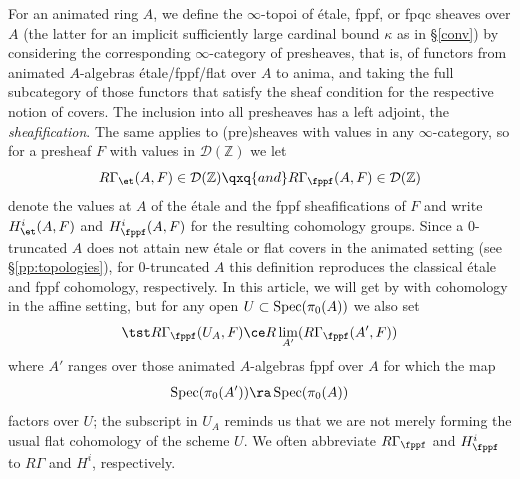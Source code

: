  \label{pp:simplicial-coho-def}
For an animated ring $A$, we define the $\infty$-topoi of \'etale, fppf, or fpqc sheaves  over $A$ (the latter for an implicit sufficiently large cardinal bound $\kappa$ as in \S\ref{conv}) by considering the corresponding $\infty$-category of presheaves, that is, of functors from animated $A$-algebras \'etale/fppf/flat over $A$ to anima, and taking the full subcategory of those functors that satisfy the sheaf condition for the respective notion of covers. The inclusion into all presheaves has a left adjoint, the \emph{sheafification}. The same applies to (pre)sheaves with values in any $\infty$-category, so for a presheaf $F$ with values in $\mathcal D(\mathbb Z)$ we let
\[
R\Gamma_\et(A, F) \in \mathcal D(\mathbb Z) \qxq{and} R\Gamma_\fppf(A,F)\in \mathcal D(\mathbb Z)
\]
denote the values at $A$ of the \'{e}tale and the fppf sheafifications of $F$ and write $H^i_\et(A, F)$ and $H^i_\fppf(A, F)$ for the resulting cohomology groups. Since a $0$-truncated $A$ does not attain new \'{e}tale or flat covers in the animated setting (see \S\ref{pp:topologies}), for $0$-truncated $A$ this definition reproduces the classical \'{e}tale and fppf cohomology, respectively. In this article, we will get by with cohomology in the affine setting, but for any open $U \subset \operatorname{Spec}(\pi_0(A))$ we also set
\[
\tst R\Gamma_\fppf(U_A, F) \ce R\lim_{A'} (R\Gamma_\fppf(A', F))
\]
 where $A'$ ranges over those animated $A$-algebras fppf over $A$ for which the map
 \[
 \Spec(\pi_0(A')) \ra \Spec(\pi_0(A))
 \]
 factors over $U$; the subscript in $U_A$ reminds us that we are not merely forming the usual flat cohomology of the scheme $U$. We often abbreviate $R\Gamma_\fppf$ and $H^i_\fppf$ to $R\Gamma$ and $H^i$, respectively.



